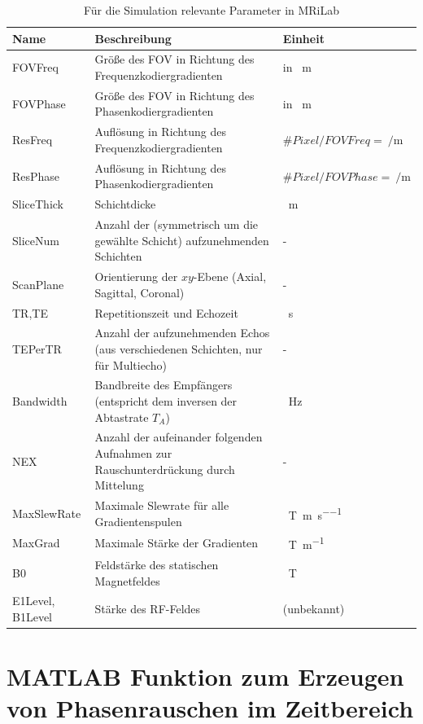 \begin{table}[H]
	\caption{Für die Simulation relevante Parameter in MRiLab}
	\centering
	\begin{tabularx}{\textwidth}{l X l}
		\toprule
		\textbf{Name} & \textbf{Beschreibung} & \textbf{Einheit} \\
		\midrule
		FOVFreq & Größe des FOV in Richtung des Frequenzkodiergradienten & in \SI{}{\m}\\
		FOVPhase & Größe des FOV in Richtung des Phasenkodiergradienten & in \SI{}{\m}\\
		ResFreq & Auflösung in Richtung des Frequenzkodiergradienten & $\#Pixel/FOVFreq=\SI{}{\per\m}$\\
		ResPhase & Auflösung in Richtung des Phasenkodiergradienten & $\#Pixel/FOVPhase=\SI{}{\per\m}$\\
		SliceThick & Schichtdicke & \SI{}{\m}\\
		SliceNum & Anzahl der (symmetrisch um die gewählte Schicht) aufzunehmenden Schichten & - \\
		ScanPlane & Orientierung der $xy$-Ebene (Axial, Sagittal, Coronal) & - \\
		TR,TE & Repetitionszeit und Echozeit & \SI{}{\s}\\
		TEPerTR & Anzahl der aufzunehmenden Echos (aus verschiedenen Schichten, nur für Multiecho) & - \\
		Bandwidth & Bandbreite des Empfängers (entspricht dem inversen der Abtastrate $T_A$) & \SI{}{\hertz}\\
		NEX & Anzahl der aufeinander folgenden Aufnahmen zur Rauschunterdrückung durch Mittelung & - \\
		MaxSlewRate & Maximale Slewrate für alle Gradientenspulen & \SI{}{\tesla\per\m\per\s}\\
		MaxGrad & Maximale Stärke der Gradienten & \SI{}{\tesla\per\m}\\
		B0 & Feldstärke des statischen Magnetfeldes & \SI{}{\tesla}\\
		E1Level, B1Level & Stärke des RF-Feldes & (unbekannt)\\
		\bottomrule
	\end{tabularx}
	\label{tab:mriLabParam}
\end{table}

\clearpage
\section{MATLAB Funktion zum Erzeugen von Phasenrauschen im Zeitbereich}
\label{sec:addPhaseNoise}


